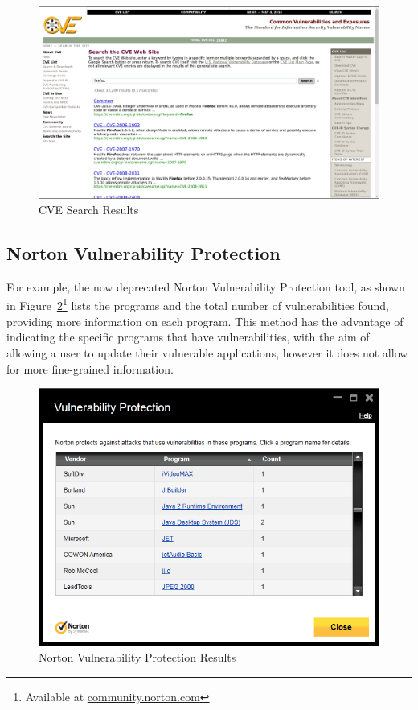 \begin{figure} \centering \includegraphics[width=0.9\linewidth]{cve-lookup}
\caption{CVE Search Results}\label{fig:cve} \end{figure}

\subsection{Norton Vulnerability Protection}\label{sec:nor}

For example, the now deprecated Norton Vulnerability Protection tool, as shown
in Figure~\ref{fig:nort}\footnote{Available at \url{community.norton.com}}
lists the programs and the total number of  vulnerabilities found, providing
more information on each program.  This method has the advantage of indicating
the specific programs that have vulnerabilities, with the aim of allowing a
user to update their vulnerable applications, however it does not allow for
more fine-grained information.


\begin{figure}[h!t]  \centering \includegraphics[width=0.9\linewidth]{norton-cve}

	 \caption{Norton Vulnerability Protection Results}\label{fig:nort}
\end{figure}

